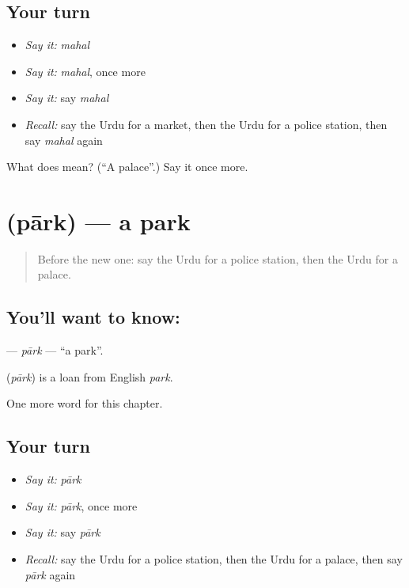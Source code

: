 \subsection*{Your turn}
\begin{itemize}
\raggedright
  \item \emph{Say it:} \emph{mahal}
  \item \emph{Say it:} \emph{mahal}, once more
  \item \emph{Say it:} say \emph{mahal}
  \item \emph{Recall:} say the Urdu for a market, then the Urdu for a police station, then say \emph{mahal} again
\end{itemize}

\begin{tcolorbox}[breakable,colback=teal!4,colframe=teal!35!black,title={Before you move on}]
What does  mean? (\textquotedblleft{}A palace\textquotedblright{}.) Say it once more.
\end{tcolorbox}
\section[\texorpdfstring{\ur{پارک} (pārk)}{پارک (pārk)}]{ (pārk) — a park}

\label{lesson:UR-C101-park}



\begin{quote}
Before the new one: say the Urdu for a police station, then the Urdu for a palace.
\end{quote}

\subsection*{You'll want to know: }
\textbf{} — \emph{pārk} — \textquotedblleft{}a park\textquotedblright{}.

\begin{cousinweb}
\textbf{} (\emph{pārk}) is a loan from English \emph{park}.
\end{cousinweb}

\begin{grammarlens}[title={What you've built}]
One more word for this chapter.
\end{grammarlens}

\subsection*{Your turn}
\begin{itemize}
\raggedright
  \item \emph{Say it:} \emph{pārk}
  \item \emph{Say it:} \emph{pārk}, once more
  \item \emph{Say it:} say \emph{pārk}
  \item \emph{Recall:} say the Urdu for a police station, then the Urdu for a palace, then say \emph{pārk} again
\end{itemize}

